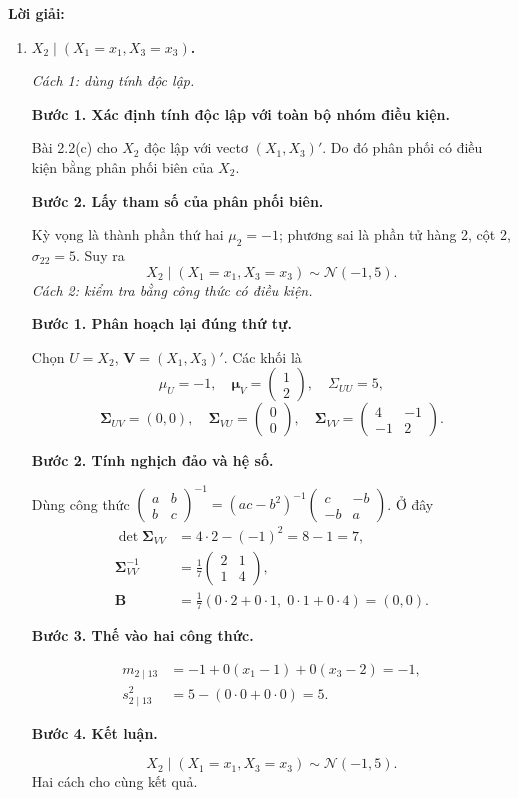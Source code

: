 \documentclass[11pt,a4paper]{article}
\renewcommand{\boldsymbol}[1]{\symbf{#1}}
\newenvironment{solution}{%
  \par\medskip\noindent\textbf{Lời giải:}\par\nopagebreak[4]\smallskip\noindent\ignorespaces
}{\par}
\newcommand{\answer}[1]{\boxed{#1}}
\newcommand{\step}[2]{\par\medskip\noindent\textbf{Bước #1. #2}\par\nopagebreak[4]\smallskip\noindent}
\begin{document}
\begin{solution}
\begin{enumerate}[label=\textbf{\alph*)}]
\[\]
Kết quả không phụ thuộc $x_2$, phù hợp với tính độc lập ở Bài 2.2(c).
\item \textbf{$X_2\mid(X_1=x_1,X_3=x_3)$.}\par\nopagebreak[4]
\textit{Cách 1: dùng tính độc lập.}
\step{1}{Xác định tính độc lập với toàn bộ nhóm điều kiện.}
Bài 2.2(c) cho $X_2$ độc lập với vectơ $(X_1,X_3)'$.
Do đó phân phối có điều kiện bằng phân phối biên của $X_2$.
\step{2}{Lấy tham số của phân phối biên.}
Kỳ vọng là thành phần thứ hai $\mu_2=-1$; phương sai là phần tử
hàng 2, cột 2, $\sigma_{22}=5$. Suy ra
\[
X_2\mid(X_1=x_1,X_3=x_3)\sim\answer{\mathcal{N}(-1,5)}.
\]
\textit{Cách 2: kiểm tra bằng công thức có điều kiện.}
\step{1}{Phân hoạch lại đúng thứ tự.}
Chọn $U=X_2$, $\mathbf{V}=(X_1,X_3)'$. Các khối là
\[
\mu_U=-1,\quad\boldsymbol{\mu}_V=\begin{pmatrix}1\\2\end{pmatrix},\quad
\Sigma_{UU}=5,
\]
\[
\boldsymbol{\Sigma}_{UV}=(0,0),\quad
\boldsymbol{\Sigma}_{VU}=\begin{pmatrix}0\\0\end{pmatrix},\quad
\boldsymbol{\Sigma}_{VV}=\begin{pmatrix}4&-1\\-1&2\end{pmatrix}.
\]
\step{2}{Tính nghịch đảo và hệ số.}
Dùng công thức $\begin{pmatrix}a&b\\b&c\end{pmatrix}^{-1}
=(ac-b^2)^{-1}\begin{pmatrix}c&-b\\-b&a\end{pmatrix}$.
Ở đây
\begin{align*}
\det\boldsymbol{\Sigma}_{VV}&=4\cdot2-(-1)^2=8-1=7,\\
\boldsymbol{\Sigma}_{VV}^{-1}&=\frac17\begin{pmatrix}2&1\\1&4\end{pmatrix},\\
\mathbf{B}&=\frac17(0\cdot2+0\cdot1,\;0\cdot1+0\cdot4)=(0,0).
\end{align*}
\step{3}{Thế vào hai công thức.}
\begin{align*}
m_{2\mid13}&=-1+0(x_1-1)+0(x_3-2)=-1,\\
s^2_{2\mid13}&=5-(0\cdot0+0\cdot0)=5.
\end{align*}
\step{4}{Kết luận.}
\[
X_2\mid(X_1=x_1,X_3=x_3)\sim\answer{\mathcal{N}(-1,5)}.
\]
Hai cách cho cùng kết quả.
\end{enumerate}
\end{solution}
\end{document}
